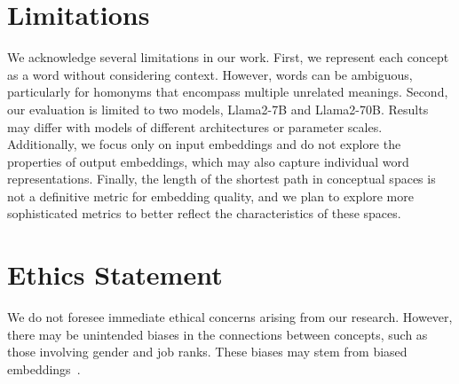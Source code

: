 \section{Limitations}
We acknowledge several limitations in our work. First, we represent each concept as a word without considering context. However, words can be ambiguous, particularly for homonyms that encompass multiple unrelated meanings. Second, our evaluation is limited to two models, Llama2-7B and Llama2-70B. Results may differ with models of different architectures or parameter scales. Additionally, we focus only on input embeddings and do not explore the properties of output embeddings, which may also capture individual word representations. Finally, the length of the shortest path in conceptual spaces is not a definitive metric for embedding quality, and we plan to explore more sophisticated metrics to better reflect the characteristics of these spaces.

\section{Ethics Statement}
We do not foresee immediate ethical concerns arising from our research. However, there may be unintended biases in the connections between concepts, such as those involving gender and job ranks. These biases may stem from biased embeddings~\cite{Bordes2013wn18, bolukbasi2016man}.
